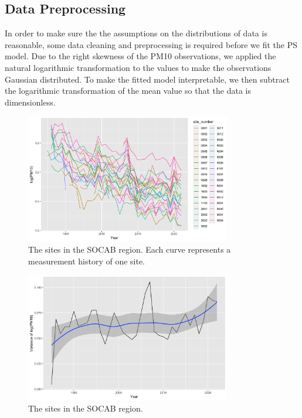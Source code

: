 \subsection{Data Preprocessing}
In order to make sure the the assumptions on the distributions of data is reasonable, some data
cleaning and preprocessing is required before we fit the PS model. Due to the right skewness of the
PM10 observations, we applied the natural logarithmic transformation to the values to make the 
observations Gaussian distributed. To make the fitted model interpretable, we then subtract the 
logarithmic transformation of the mean value so that the data is dimensionless. 
\begin{figure}[ht]
	\centering
	\includegraphics[width = 0.8\textwidth]{socab_plots/logPM10_traces.png}
	\caption{The sites in the SOCAB region. Each curve represents a measurement history of one site.}
	\label{fig:logpm10_traces}
\end{figure}

\begin{figure}[ht]
	\centering
	\includegraphics[width = 0.8\textwidth]{socab_plots/logPM10_var.png}
	\caption{The sites in the SOCAB region.}
	\label{fig:logpm10_var}
\end{figure}

